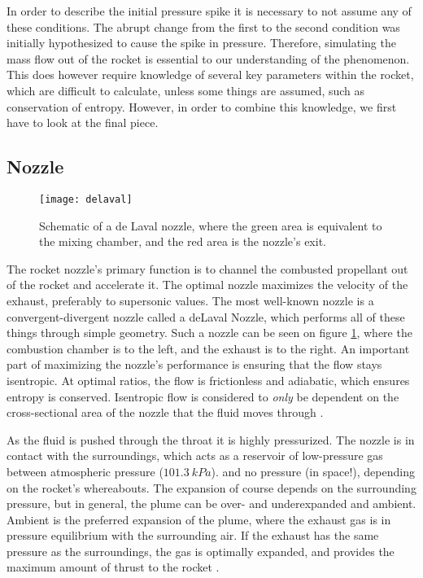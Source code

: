 	In order to describe the initial pressure spike it is necessary to not assume any of these conditions. The abrupt change from the first to the second condition was initially hypothesized to cause the spike in pressure. Therefore, simulating the mass flow out of the rocket is essential to our understanding of the phenomenon. This does however require knowledge of several key parameters within the rocket, which are difficult to calculate, unless some things are assumed, such as conservation of entropy. However, in order to combine this knowledge, we first have to look at the final piece.

\subsection{Nozzle}

	\begin{figure}
		\texttt{[image: delaval]}
		\caption{Schematic of a de Laval nozzle, where the green area is equivalent to the mixing chamber, and the red area is the nozzle's exit.}
		\label{fig:delaval}
	\end{figure}

	The rocket nozzle's primary function is to channel the combusted propellant out of the rocket and accelerate it. The optimal nozzle maximizes the velocity of the exhaust, preferably to supersonic values. The most well-known nozzle is a convergent-divergent nozzle called a deLaval Nozzle, which performs all of these things through simple geometry. Such a nozzle can be seen on figure \ref{fig:delaval}, where the combustion chamber is to the left, and the exhaust is to the right. An important part of maximizing the nozzle's performance is ensuring that the flow stays isentropic. At optimal ratios, the flow is frictionless and adiabatic, which ensures entropy is conserved. Isentropic flow is considered to \emph{only} be dependent on the cross-sectional area of the nozzle that the fluid moves through \cite{nakkanozz}.

	As the fluid is pushed through the throat it is highly pressurized. The nozzle is in contact with the surroundings, which acts as a reservoir of low-pressure gas between atmospheric pressure ($\SI{101.3}{kPa}$).
	and no pressure (in space!), depending on the rocket's whereabouts. The expansion of course depends on the surrounding pressure, but in general, the plume can be over- and underexpanded and ambient. Ambient is the preferred expansion of the plume, where the exhaust gas is in pressure equilibrium with the surrounding air. If the exhaust has the same pressure as the surroundings, the gas is optimally expanded, and provides the maximum amount of thrust to the rocket \cite{robertnozzle}.

